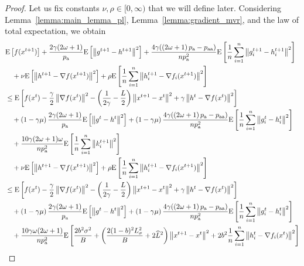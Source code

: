 \documentclass{article}
\newcommand*{\probavailable}{\ensuremath{p_{\textnormal{a}}}}
\newcommand*{\probpairaa}{\ensuremath{p_{\textnormal{aa}}}}
\begin{document}
  \begin{proof}
    Let us fix constants $\nu, \rho \in [0,\infty)$ that we will define later. Considering Lemma~\ref{lemma:main_lemma_pl}, Lemma~\ref{lemma:gradient_mvr}, and the law of total expectation, we obtain
      \begin{align*}
        &\Exp{f(x^{t + 1})} + \frac{2\gamma (2\omega + 1)}{\probavailable} \Exp{\norm{g^{t+1} - h^{t+1}}^2} + \frac{4 \gamma (\left(2 \omega + 1\right)\probavailable - \probpairaa)}{n \probavailable^2} \Exp{\frac{1}{n}\sum_{i=1}^n\norm{g^{t+1}_i - h^{t+1}_i}^2}\\
        &\quad  + \nu \Exp{\norm{h^{t+1} - \nabla f(x^{t+1})}^2} + \rho \Exp{\frac{1}{n}\sum_{i=1}^n\norm{h^{t+1}_i - \nabla f_i(x^{t+1})}^2}\\
        &\leq \Exp{f(x^t) - \frac{\gamma}{2}\norm{\nabla f(x^t)}^2 - \left(\frac{1}{2\gamma} - \frac{L}{2}\right)
        \norm{x^{t+1} - x^t}^2 + \gamma \norm{h^{t} - \nabla f(x^t)}^2}\nonumber\\
        &\quad + \left(1 - \gamma \mu\right)\frac{2\gamma(2\omega + 1)}{\probavailable}\Exp{\norm{g^{t} - h^t}^2} + \left(1 - \gamma \mu\right)\frac{4 \gamma (\left(2 \omega + 1\right)\probavailable - \probpairaa)}{n \probavailable^2}\Exp{\frac{1}{n} \sum_{i=1}^n\norm{g^t_i - h^{t}_i}^2}\nonumber\\
        &\quad + \frac{10 \gamma (2 \omega + 1)\omega}{n \probavailable^2}\Exp{\frac{1}{n} \sum_{i=1}^n\norm{k^{t+1}_i}^2} \\
        &\quad  + \nu \Exp{\norm{h^{t+1} - \nabla f(x^{t+1})}^2} + \rho \Exp{\frac{1}{n}\sum_{i=1}^n\norm{h^{t+1}_i - \nabla f_i(x^{t+1})}^2}\\
        &\leq \Exp{f(x^t) - \frac{\gamma}{2}\norm{\nabla f(x^t)}^2 - \left(\frac{1}{2\gamma} - \frac{L}{2}\right)
        \norm{x^{t+1} - x^t}^2 + \gamma \norm{h^{t} - \nabla f(x^t)}^2}\nonumber\\
        &\quad + \left(1 - \gamma \mu\right)\frac{2 \gamma (2 \omega + 1)}{\probavailable}\Exp{\norm{g^{t} - h^t}^2}+ \left(1 - \gamma \mu\right)\frac{4\gamma (\left(2 \omega + 1\right)\probavailable - \probpairaa)}{n \probavailable^2}\Exp{\frac{1}{n} \sum_{i=1}^n\norm{g^t_i - h^{t}_i}^2} \\
        &\quad + \frac{10 \gamma \omega (2 \omega + 1)}{n \probavailable^2} \Exp{\frac{2 b^2 \sigma^2}{B} + \left(\frac{2 (1 - b)^2 L_{\sigma}^2}{B} + 2 \widehat{L}^2\right)\norm{x^{t+1} - x^{t}}^2 + 2 b^2 \frac{1}{n} \sum_{i=1}^n \norm{h^t_i - \nabla f_i(x^{t})}^2} \\

\end{align*}
\end{proof}
\end{document}
